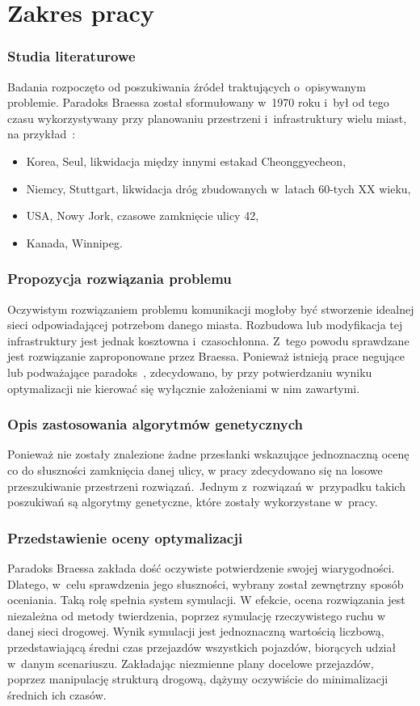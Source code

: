 \documentclass[twoside,12pt]{report}
\begin{document}
\section{Zakres pracy}
\subsubsection{Studia literaturowe}
Badania rozpoczęto od poszukiwania źródeł traktujących o~opisywanym problemie. Paradoks Braessa został sformułowany w~1970 roku i~był od tego czasu wykorzystywany przy planowaniu przestrzeni i~infrastruktury wielu miast, na przykład~\cite{urban}:

\begin{itemize}
\item Korea, Seul, likwidacja między innymi estakad Cheonggyecheon,
\item Niemcy, Stuttgart, likwidacja dróg zbudowanych w~latach 60-tych XX wieku,
\item USA, Nowy Jork, czasowe zamknięcie ulicy 42,
\item Kanada, Winnipeg.
\end{itemize}  

\subsubsection{Propozycja rozwiązania problemu}
Oczywistym rozwiązaniem problemu komunikacji mogłoby być stworzenie idealnej sieci odpowiadającej potrzebom danego miasta. Rozbudowa lub modyfikacja tej infrastruktury jest jednak kosztowna i~czasochłonna. Z~tego powodu sprawdzane jest rozwiązanie zaproponowane przez Braessa. Ponieważ istnieją prace negujące lub podważające paradoks~\cite{newinsights}, zdecydowano, by przy potwierdzaniu wyniku optymalizacji nie kierować się wyłącznie założeniami w nim zawartymi.

\subsubsection{Opis zastosowania algorytmów genetycznych}
Ponieważ nie zostały znalezione żadne przesłanki wskazujące jednoznaczną ocenę co do słuszności zamknięcia danej ulicy, w pracy zdecydowano się na losowe przeszukiwanie przestrzeni rozwiązań.~Jednym z~rozwiązań w~przypadku takich poszukiwań są algorytmy genetyczne, które zostały wykorzystane w~pracy.

\subsubsection{Przedstawienie oceny optymalizacji}
Paradoks Braessa zakłada dość oczywiste potwierdzenie swojej wiarygodności. Dlatego, w~celu sprawdzenia jego słuszności, wybrany został zewnętrzny sposób oceniania. Taką rolę spełnia system symulacji. W efekcie, ocena rozwiązania jest niezależna od metody twierdzenia, poprzez symulację rzeczywistego ruchu w danej sieci drogowej. Wynik symulacji jest jednoznaczną wartością liczbową, przedstawiającą średni czas przejazdów wszystkich pojazdów, biorących udział w~danym scenariuszu. Zakładając niezmienne plany docelowe przejazdów, poprzez manipulację strukturą drogową, dążymy oczywiście do minimalizacji średnich ich czasów.
\end{document}

